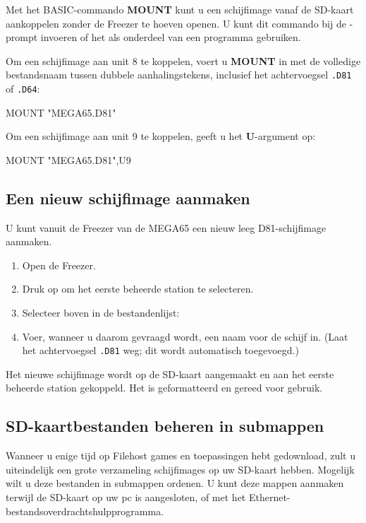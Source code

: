 Met het BASIC-commando {\bf MOUNT} kunt u een schijfimage vanaf de SD-kaart aankoppelen zonder de Freezer te hoeven openen. U kunt dit commando bij de -prompt invoeren of het als onderdeel van een programma gebruiken.

Om een schijfimage aan unit 8 te koppelen, voert u {\bf MOUNT} in met de volledige bestandsnaam tussen dubbele aanhalingstekens, inclusief het achtervoegsel {\tt .D81} of {\tt .D64}:

\begin{screencode}
MOUNT "MEGA65.D81"
\end{screencode}

Om een schijfimage aan unit 9 te koppelen, geeft u het {\bf U}-argument op:

\begin{screencode}
MOUNT "MEGA65.D81",U9
\end{screencode}

\subsection{Een nieuw schijfimage aanmaken}

U kunt vanuit de Freezer van de MEGA65 een nieuw leeg D81-schijfimage aanmaken.

\begin{enumerate}
\item Open de Freezer.\item Druk op  om het eerste beheerde station te selecteren.\item Selecteer boven in de bestandenlijst: \item Voer, wanneer u daarom gevraagd wordt, een naam voor de schijf in. (Laat het achtervoegsel {\tt .D81} weg; dit wordt automatisch toegevoegd.)
\end{enumerate}

Het nieuwe schijfimage wordt op de SD-kaart aangemaakt en aan het eerste beheerde station gekoppeld. Het is geformatteerd en gereed voor gebruik.

\subsection{SD-kaartbestanden beheren in submappen}

Wanneer u enige tijd op Filehost games en toepassingen hebt gedownload, zult u uiteindelijk een grote verzameling schijfimages op uw SD-kaart hebben. Mogelijk wilt u deze bestanden in submappen ordenen. U kunt deze mappen aanmaken terwijl de SD-kaart op uw pc is aangesloten, of met het Ethernet-bestandsoverdrachtshulpprogramma.

